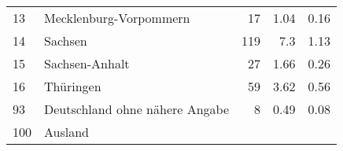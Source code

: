 \begin{longtable}{lXrrr}
     13 &
     \multicolumn{1}{X}{ Mecklenburg-Vorpommern   } &


       \num{17} &
       \num[round-mode=places,round-precision=2]{1,04} &
         \num[round-mode=places,round-precision=2]{0,16} \\

     14 &
     \multicolumn{1}{X}{ Sachsen   } &


       \num{119} &
       \num[round-mode=places,round-precision=2]{7,3} &
         \num[round-mode=places,round-precision=2]{1,13} \\

     15 &
     \multicolumn{1}{X}{ Sachsen-Anhalt   } &


       \num{27} &
       \num[round-mode=places,round-precision=2]{1,66} &
         \num[round-mode=places,round-precision=2]{0,26} \\

     16 &
     \multicolumn{1}{X}{ Thüringen   } &


       \num{59} &
       \num[round-mode=places,round-precision=2]{3,62} &
         \num[round-mode=places,round-precision=2]{0,56} \\

     93 &
     \multicolumn{1}{X}{ Deutschland ohne nähere Angabe   } &


       \num{8} &
       \num[round-mode=places,round-precision=2]{0,49} &
         \num[round-mode=places,round-precision=2]{0,08} \\

     100 &
     \multicolumn{1}{X}{ Ausland   } &



\end{longtable}
